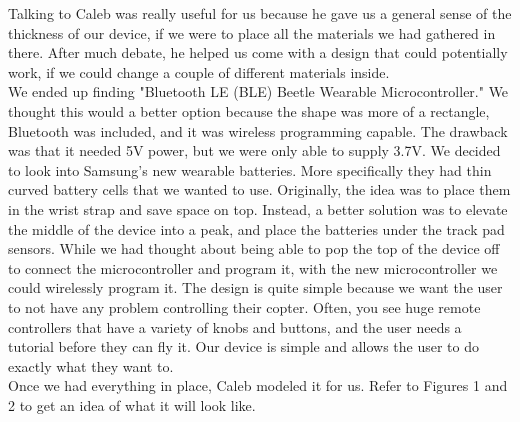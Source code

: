 \documentclass[12pt,letterpaper]{article}
\begin{document}
\hspace{1cm}Talking to Caleb was really useful for us because he gave us a general sense of the thickness of our device, if we were to place all the materials we had gathered in there. After much debate, he helped us come with a design that could potentially work, if we could change a couple of different materials inside.\\
\hspace{1cm}We ended up finding "Bluetooth LE (BLE) Beetle Wearable Microcontroller." We thought this would a better option because the shape was more of a rectangle, Bluetooth was included, and it was wireless programming capable. The drawback was that it needed 5V power, but we were only able to supply 3.7V. We decided to look into Samsung's new wearable batteries. More specifically they had thin curved battery cells that we wanted to use. Originally, the idea was to place them in the wrist strap and save space on top. Instead, a better solution was to elevate the middle of the device into a peak, and place the batteries under the track pad sensors. While we had thought about being able to pop the top of the device off to connect the microcontroller and program it, with the new microcontroller we could wirelessly program it. The design is quite simple because we want the user to not have any problem controlling their copter. Often, you see huge remote controllers that have a variety of knobs and buttons, and the user needs a tutorial before they can fly it. Our device is simple and allows the user to do exactly what they want to.\\
Once we had everything in place, Caleb modeled it for us. Refer to Figures 1 and 2 to get an idea of what it will look like.
\end{document}

